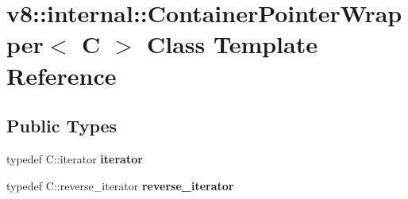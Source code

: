 \hypertarget{classv8_1_1internal_1_1_container_pointer_wrapper}{}\section{v8\+:\+:internal\+:\+:Container\+Pointer\+Wrapper$<$ C $>$ Class Template Reference}
\label{classv8_1_1internal_1_1_container_pointer_wrapper}
\subsection*{Public Types}
\begin{DoxyCompactItemize}
\item 
\hypertarget{classv8_1_1internal_1_1_container_pointer_wrapper_a8ce3e575ab3909b036507e84c247fcc4}{}typedef C\+::iterator {\bfseries iterator}\label{classv8_1_1internal_1_1_container_pointer_wrapper_a8ce3e575ab3909b036507e84c247fcc4}

\item 
\hypertarget{classv8_1_1internal_1_1_container_pointer_wrapper_a931f0daac106cb752cc0cceb578489c9}{}typedef C\+::reverse\+\_\+iterator {\bfseries reverse\+\_\+iterator}\label{classv8_1_1internal_1_1_container_pointer_wrapper_a931f0daac106cb752cc0cceb578489c9}

\end{DoxyCompactItemize}
